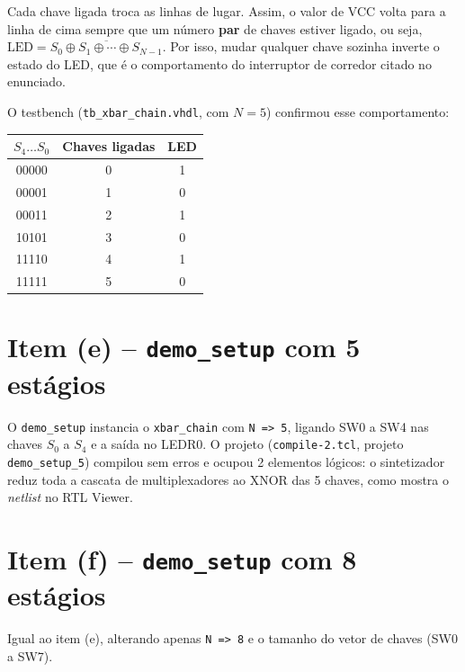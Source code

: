 \documentclass[report, 12pt]{uftreport}
\begin{document}


Cada chave ligada troca as linhas de lugar. Assim, o valor de VCC volta para a linha de cima sempre que um número \textbf{par} de chaves estiver ligado, ou seja, $\text{LED} = \overline{S_0 \oplus S_1 \oplus \cdots \oplus S_{N-1}}$. Por isso, mudar qualquer chave sozinha inverte o estado do LED, que é o comportamento do interruptor de corredor citado no enunciado.

O testbench (\texttt{tb\_xbar\_chain.vhdl}, com $N = 5$) confirmou esse comportamento:

\begin{center}
\begin{tabular}{ccc}
\toprule
$S_4 \ldots S_0$ & Chaves ligadas & LED \\
\midrule
00000 & 0 & 1 \\
00001 & 1 & 0 \\
00011 & 2 & 1 \\
10101 & 3 & 0 \\
11110 & 4 & 1 \\
11111 & 5 & 0 \\
\bottomrule
\end{tabular}
\end{center}

\section{Item (e) -- \texttt{demo\_setup} com 5 estágios}

O \texttt{demo\_setup} instancia o \texttt{xbar\_chain} com \texttt{N => 5}, ligando SW0 a SW4 nas chaves $S_0$ a $S_4$ e a saída no LEDR0. O projeto (\texttt{compile-2.tcl}, projeto \texttt{demo\_setup\_5}) compilou sem erros e ocupou 2 elementos lógicos: o sintetizador reduz toda a cascata de multiplexadores ao XNOR das 5 chaves, como mostra o \textit{netlist} no RTL Viewer.



\section{Item (f) -- \texttt{demo\_setup} com 8 estágios}

Igual ao item (e), alterando apenas \texttt{N => 8} e o tamanho do vetor de chaves (SW0 a SW7).



\end{document}
